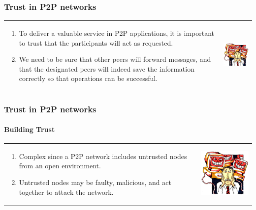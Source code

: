 

\begin{frame}
\frametitle{Trust in P2P networks}
\begin{table}
\begin{tabular}{p{7cm}p{3cm}}
\begin{enumerate}
    \item To deliver a valuable service in P2P applications, it
is important to trust that the participants will act as requested.
    \item We need to be sure that other peers will forward
messages, and that the designated peers will indeed save the information
correctly so that operations can be successful.
\end{enumerate}
&
\vspace{1.5cm}
\includegraphics[width=4cm]{img/malicious}\\
\end{tabular}
\end{table}
\end{frame}

\begin{frame}
\frametitle{Trust in P2P networks}
\framesubtitle{Building Trust}
\begin{table}
\begin{tabular}{p{7cm}p{3cm}}
\begin{enumerate}
    \item Complex since a P2P network includes untrusted nodes from an open environment.
    \item Untrusted nodes may be faulty, malicious, and act together to attack the network.
\end{enumerate}
&
\vspace{1.5cm}
\includegraphics[width=4cm]{img/malicious}\\
\end{tabular}
\end{table}
\end{frame}


